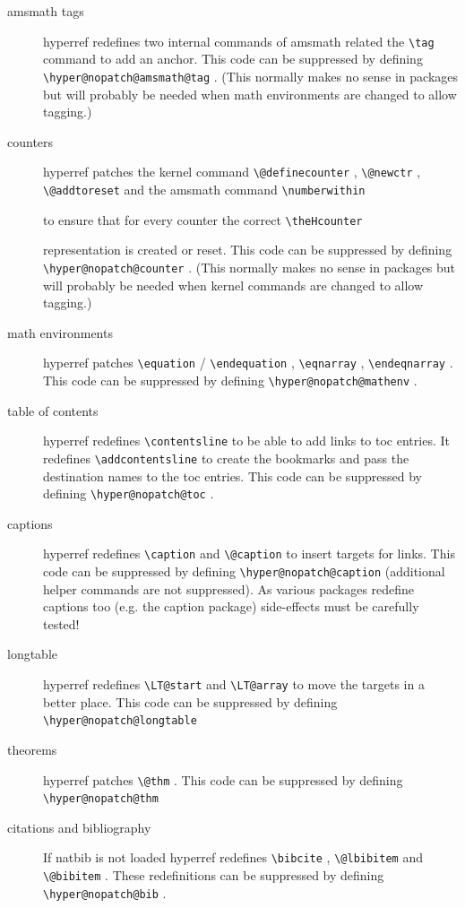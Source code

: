 \documentclass{article}
\newcommand*{\cs}[1]{%
  \texttt{\textbackslash #1}%
}
\newcommand*{\xpackage}[1]{\textsf{#1}}
\begin{document}
\begin{description}
\item[amsmath tags] \xpackage{hyperref} redefines two internal commands of amsmath
    related the \cs{tag} command to add an anchor. This code can be
    suppressed by defining \cs{hyper@nopatch@amsmath@tag}. (This normally
    makes no sense in packages but will probably be needed when math
    environments are changed to allow tagging.)

\item[counters] \xpackage{hyperref} patches the kernel command \cs{@definecounter},
    \cs{@newctr}, \cs{@addtoreset} and the amsmath command \cs{numberwithin}
    to ensure that for every counter the correct \cs{theHcounter}
    representation is created or reset. This code can be suppressed by
    defining \cs{hyper@nopatch@counter}. (This normally makes no sense in
    packages but will probably be needed when kernel commands are changed
    to allow tagging.)

\item[math environments] \xpackage{hyperref} patches \cs{equation}/\cs{endequation}, \cs{eqnarray},
    \cs{endeqnarray}. This code can be suppressed by
    defining \cs{hyper@nopatch@mathenv}.

\item[table of contents] \xpackage{hyperref} redefines \cs{contentsline} to be able to add links to
toc entries. It redefines \cs{addcontentsline} to create the bookmarks and pass the
destination names to the toc entries. This code can be suppressed by defining \cs{hyper@nopatch@toc}.

\item[captions] \xpackage{hyperref} redefines \cs{caption} and \cs{@caption} to insert targets for links.
This code can be suppressed by defining \cs{hyper@nopatch@caption} (additional helper commands are
not suppressed). As various packages redefine captions too (e.g. the \xpackage{caption} package)
side-effects must be carefully tested!

\item[longtable] \xpackage{hyperref} redefines \cs{LT@start} and \cs{LT@array} to move the targets in a better place.
This code can be suppressed by defining \cs{hyper@nopatch@longtable}

\item[theorems] \xpackage{hyperref} patches \cs{@thm}. This code can be suppressed by defining \cs{hyper@nopatch@thm}

\item[citations and bibliography] If \xpackage{natbib} is not loaded \xpackage{hyperref} redefines \cs{bibcite},
\cs{@lbibitem}  and \cs{@bibitem}. These redefinitions can be suppressed by defining \cs{hyper@nopatch@bib}.
\end{description}
\end{document}
